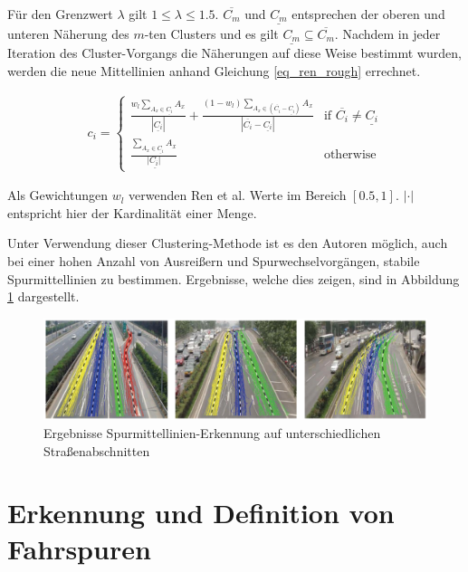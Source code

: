 Für den Grenzwert $\lambda$ gilt $1 \leq \lambda \leq 1.5$. $\overline{C_m}$ und $\underline{C_m}$ entsprechen der oberen und unteren
Näherung des $m$-ten Clusters und es gilt $\underline{C_m} \subseteq \overline{C_m}$.
Nachdem in jeder Iteration des Cluster-Vorgangs die Näherungen auf diese Weise bestimmt wurden, werden die neue Mittellinien
anhand Gleichung \ref{eq_ren_rough} errechnet.

\begin{ceqn}
\begin{align}
    \label{eq_ren_rough}
    c_i =
    \begin{cases}
        \frac{w_l \sum_{A_x \in \underline{C_i}} A_x}{|\underline{C_i}|} + \frac{(1 - w_l) \sum_{A_x \in (\overline{C_i} - \underline{C_i})} A_x}{|\overline{C_i} - \underline{C_i}|} & \text{if } \overline{C_i} \neq \underline{C_i} \\
        \frac{\sum_{A_x \in \underline{C_i}} A_x}{|\underline{C_i|}} & \text{otherwise}
    \end{cases}
\end{align}
\end{ceqn}

Als Gewichtungen $w_l$ verwenden Ren et al. Werte im Bereich $[0.5, 1]$. $| \cdot |$ entspricht hier der Kardinalität einer Menge.

Unter Verwendung dieser Clustering-Methode ist es den Autoren möglich, auch bei einer hohen Anzahl von
Ausreißern und Spurwechselvorgängen, stabile Spurmittellinien zu bestimmen. Ergebnisse, welche dies zeigen, sind in Abbildung
\ref{fig:relw_ren_example_detection} dargestellt.

\begin{figure}[H]
    \centering
    \includegraphics[width=0.95\linewidth]{resources/img/RelatedWork/ren_examples_detection}
    \caption[Ergebnisse Spurmittellinien-Erkennung (Ren et al.)]
            {Ergebnisse Spurmittellinien-Erkennung auf unterschiedlichen Straßenabschnitten \cite[]{Ren2014}}
    \label{fig:relw_ren_example_detection}
\end{figure}


\section{Erkennung und Definition von Fahrspuren}
\label{sec:rw_lane_detection}

